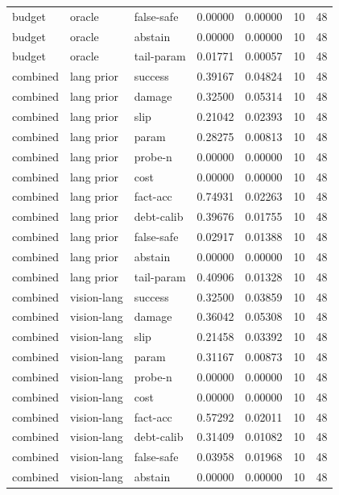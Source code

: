 \documentclass{article}
\begin{document}
\begin{center}
\begin{longtable}{lllllll}
budget & oracle & false-safe & 0.00000 & 0.00000 & 10 & 48 \\
budget & oracle & abstain & 0.00000 & 0.00000 & 10 & 48 \\
budget & oracle & tail-param & 0.01771 & 0.00057 & 10 & 48 \\
combined & lang prior & success & 0.39167 & 0.04824 & 10 & 48 \\
combined & lang prior & damage & 0.32500 & 0.05314 & 10 & 48 \\
combined & lang prior & slip & 0.21042 & 0.02393 & 10 & 48 \\
combined & lang prior & param & 0.28275 & 0.00813 & 10 & 48 \\
combined & lang prior & probe-n & 0.00000 & 0.00000 & 10 & 48 \\
combined & lang prior & cost & 0.00000 & 0.00000 & 10 & 48 \\
combined & lang prior & fact-acc & 0.74931 & 0.02263 & 10 & 48 \\
combined & lang prior & debt-calib & 0.39676 & 0.01755 & 10 & 48 \\
combined & lang prior & false-safe & 0.02917 & 0.01388 & 10 & 48 \\
combined & lang prior & abstain & 0.00000 & 0.00000 & 10 & 48 \\
combined & lang prior & tail-param & 0.40906 & 0.01328 & 10 & 48 \\
combined & vision-lang & success & 0.32500 & 0.03859 & 10 & 48 \\
combined & vision-lang & damage & 0.36042 & 0.05308 & 10 & 48 \\
combined & vision-lang & slip & 0.21458 & 0.03392 & 10 & 48 \\
combined & vision-lang & param & 0.31167 & 0.00873 & 10 & 48 \\
combined & vision-lang & probe-n & 0.00000 & 0.00000 & 10 & 48 \\
combined & vision-lang & cost & 0.00000 & 0.00000 & 10 & 48 \\
combined & vision-lang & fact-acc & 0.57292 & 0.02011 & 10 & 48 \\
combined & vision-lang & debt-calib & 0.31409 & 0.01082 & 10 & 48 \\
combined & vision-lang & false-safe & 0.03958 & 0.01968 & 10 & 48 \\
combined & vision-lang & abstain & 0.00000 & 0.00000 & 10 & 48 \\
\bottomrule
\end{longtable}
\renewcommand{\arraystretch}{1.0}
\end{center}
\end{document}
